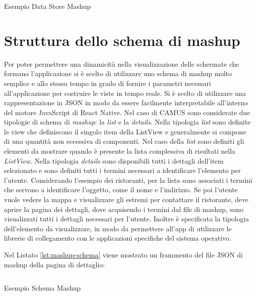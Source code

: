 \begin{listing}[H]
	\inputminted{json}{4-progettazione-alto-livello/Codice/store-two-topics.json}
	\caption{Esempio Data Store Mashup}
	\label{lst:store-two-topics}
\end{listing}
\section{Struttura dello schema di mashup\label{sec:struttura-schemi-mashup}}

Per poter permettere una dinamicità nella visualizzazione delle schermate che formano l'applicazione si è scelto di utilizzare uno schema di mashup molto semplice e allo stesso tempo in grado di fornire i parametri necessari all'applicazione per costruire le viste in tempo reale. Si è scelto di utilizzare una rappresentazione in JSON in modo da essere facilmente interpretabile all'interno del motore JavaScript di React Native. 
Nel caso di CAMUS sono considerate due tipologie di schema di \emph{mashup}: la \emph{list} e la \emph{details}. 
Nella tipologia \emph{list} sono definite le view che definiscono il singolo item della ListView e generalmente si compone di una quantità non eccessiva di componenti. 
Nel caso della \emph{list} sono definiti gli elementi da mostrare quando è presente la lista complessiva di risultati nella \emph{ListView}.
Nella tipologia \emph{details} sono disponibili tutti i dettagli dell'item selezionato e sono definiti tutti i termini necessari a identificare l'elemento per l'utente.
Considerando l'esempio dei ristoranti, per la lista sono associati i termini che servono a identificare l'oggetto, come il nome e l'indirizzo. Se poi l'utente vuole vedere la mappa e visualizzare gli estremi per contattare il ristorante, deve aprire la pagina dei dettagli, dove acquisendo i termini dal file di mashup, sono visualizzati tutti i dettagli necessari per l'utente. Inoltre è specificata la tipologia dell'elemento da visualizzare, in modo da permettere all'app di utilizzare le librerie di collegamento con le applicazioni specifiche del sistema operativo.

Nel Listato \ref{lst:mashup-schema} viene mostrato un frammento del file JSON di mashup della pagina di dettaglio:

\begin{listing}[H]
	\inputminted{json}{6-implementazione-app/Codice/mashup-schema-example-app.json}
	\caption{Esempio Schema Mashup}
	\label{lst:mashup-schema}
\end{listing}

